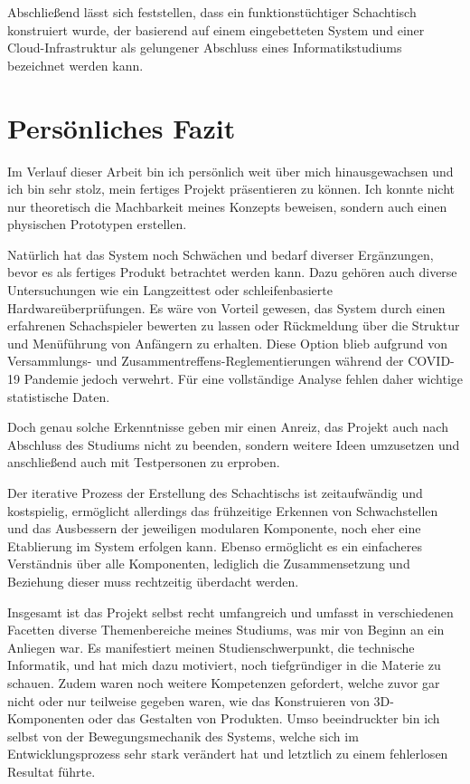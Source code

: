 Abschließend lässt sich feststellen, dass ein funktionstüchtiger
Schachtisch konstruiert wurde, der basierend auf einem eingebetteten
System und einer Cloud-Infrastruktur als gelungener Abschluss eines
Informatikstudiums bezeichnet werden kann.

\hypertarget{persuxf6nliches-fazit}{%
\section{Persönliches Fazit}\label{persuxf6nliches-fazit}}

Im Verlauf dieser Arbeit bin ich persönlich weit über mich
hinausgewachsen und ich bin sehr stolz, mein fertiges Projekt
präsentieren zu können. Ich konnte nicht nur theoretisch die Machbarkeit
meines Konzepts beweisen, sondern auch einen physischen Prototypen
erstellen.

Natürlich hat das System noch Schwächen und bedarf diverser Ergänzungen,
bevor es als fertiges Produkt betrachtet werden kann. Dazu gehören auch
diverse Untersuchungen wie ein Langzeittest oder schleifenbasierte
Hardwareüberprüfungen. Es wäre von Vorteil gewesen, das System durch
einen erfahrenen Schachspieler bewerten zu lassen oder Rückmeldung über
die Struktur und Menüführung von Anfängern zu erhalten. Diese Option
blieb aufgrund von Versammlungs- und Zusammentreffens-Reglementierungen
während der COVID-19 Pandemie jedoch verwehrt. Für eine vollständige
Analyse fehlen daher wichtige statistische Daten.

Doch genau solche Erkenntnisse geben mir einen Anreiz, das Projekt auch
nach Abschluss des Studiums nicht zu beenden, sondern weitere Ideen
umzusetzen und anschließend auch mit Testpersonen zu erproben.

Der iterative Prozess der Erstellung des Schachtischs ist zeitaufwändig
und kostspielig, ermöglicht allerdings das frühzeitige Erkennen von
Schwachstellen und das Ausbessern der jeweiligen modularen Komponente,
noch eher eine Etablierung im System erfolgen kann. Ebenso ermöglicht es
ein einfacheres Verständnis über alle Komponenten, lediglich die
Zusammensetzung und Beziehung dieser muss rechtzeitig überdacht werden.

Insgesamt ist das Projekt selbst recht umfangreich und umfasst in
verschiedenen Facetten diverse Themenbereiche meines Studiums, was mir
von Beginn an ein Anliegen war. Es manifestiert meinen
Studienschwerpunkt, die technische Informatik, und hat mich dazu
motiviert, noch tiefgründiger in die Materie zu schauen. Zudem waren
noch weitere Kompetenzen gefordert, welche zuvor gar nicht oder nur
teilweise gegeben waren, wie das Konstruieren von 3D-Komponenten oder
das Gestalten von Produkten. Umso beeindruckter bin ich selbst von der
Bewegungsmechanik des Systems, welche sich im Entwicklungsprozess sehr
stark verändert hat und letztlich zu einem fehlerlosen Resultat führte.

